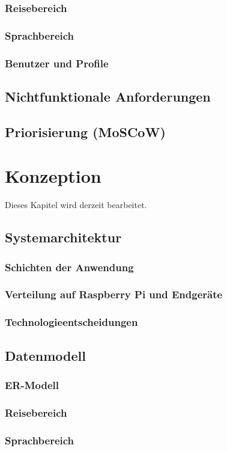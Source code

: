 \documentclass[12pt,a4paper]{scrreprt}
\begin{document}
\subsection{Reisebereich}
\subsection{Sprachbereich}
\subsection{Benutzer und Profile}
\section{Nichtfunktionale Anforderungen}
\section{Priorisierung (MoSCoW)}

\chapter{Konzeption}
Dieses Kapitel wird derzeit bearbeitet.
\section{Systemarchitektur}
\subsection{Schichten der Anwendung}
\subsection{Verteilung auf Raspberry Pi und Endgeräte}
\subsection{Technologieentscheidungen}
\section{Datenmodell}
\subsection{ER-Modell}
\subsection{Reisebereich}
\subsection{Sprachbereich}
\end{document}
